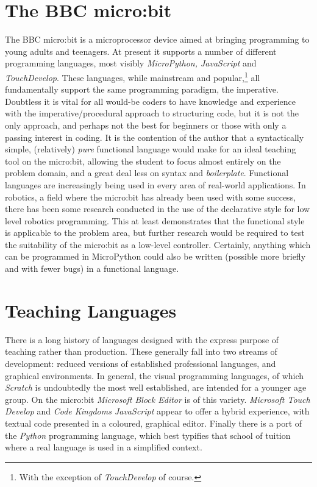 \documentclass[12pt, a4paper]{report}
\begin{document}
\section{The BBC micro:bit} The BBC micro:bit is a microprocessor device aimed at
bringing programming to young adults and teenagers. At present it supports a number of different
programming languages, most visibly \textit{MicroPython, JavaScript} and \textit{TouchDevelop}.
These languages, while mainstream and popular,\footnote{With the exception of \textit{TouchDevelop}
of course.} all fundamentally support the same programming paradigm, the imperative. Doubtless it
is vital for all would-be coders to have knowledge and experience with the imperative/procedural
approach to structuring code, but it is not the only approach, and perhaps not the best for
beginners or those with only a passing interest in coding. It is the contention of the author that
a syntactically simple, (relatively) \textit{pure} functional language would make for an ideal
teaching tool on the micro:bit, allowing the student to focus almost entirely on the problem domain,
and a great deal less on syntax and \textit{boilerplate}. Functional languages are increasingly
being used in every area of real-world applications. In robotics, a field where the micro:bit has
already been used with some success, there has been some research conducted in the use of the declarative style
for low level robotics programming\cite{frob}. This at least demonstrates that the functional style
is applicable to the problem area, but further research would be required to test the suitability of
the micro:bit as a low-level controller. Certainly, anything which can be programmed in MicroPython
could also be written (possible more briefly and with fewer bugs) in a functional language.

\section{Teaching Languages}
There is a long history of languages designed with the express purpose of teaching rather than
production. These generally fall into two streams of development: reduced versions of established
professional languages, and graphical environments. In general, the visual programming languages, of
which \textit{Scratch} is undoubtedly the most well established, are intended for a younger age
group. On the micro:bit \textit{Microsoft Block Editor} is of this variety. 
\textit{Microsoft Touch Develop} and \textit{Code Kingdoms JavaScript} appear to offer a hybrid
experience, with textual code presented in a coloured, graphical editor. Finally there is a port of
the \textit{Python} programming language, which best typifies that school of tuition where a real
language is used in a simplified context.
\end{document}
